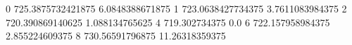 0 725.3875732421875 6.0848388671875
1 723.0638427734375 3.7611083984375
2 720.390869140625 1.088134765625
4 719.302734375 0.0
6 722.157958984375 2.855224609375
8 730.56591796875 11.26318359375
